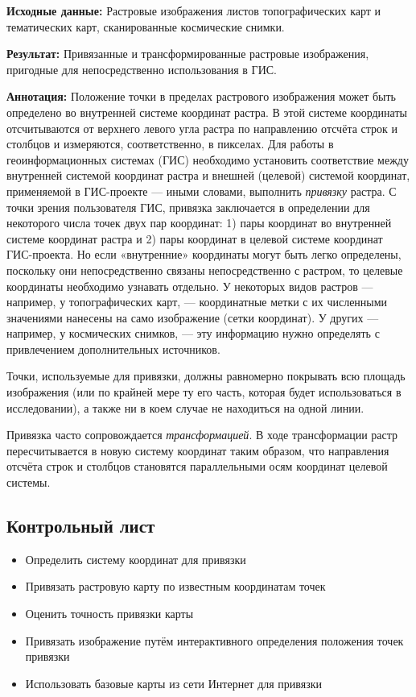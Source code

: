 \documentclass[
  12pt,
]{book}
\providecommand{\tightlist}{%
  \setlength{\itemsep}{0pt}\setlength{\parskip}{0pt}}
\begin{document}
\textbf{Исходные данные:} Растровые изображения листов топографических карт и тематических карт, сканированные космические снимки.

\textbf{Результат:} Привязанные и трансформированные растровые изображения, пригодные для непосредственно использования в ГИС.

\textbf{Аннотация:} Положение точки в пределах растрового изображения может быть определено во внутренней системе координат растра. В этой системе координаты отсчитываются от верхнего левого угла растра по направлению отсчёта строк и столбцов и измеряются, соответственно, в пикселах. Для работы в геоинформационных системах (ГИС) необходимо установить соответствие между внутренней системой координат растра и внешней (целевой) системой координат, применяемой в ГИС-проекте --- иными словами, выполнить \emph{привязку} растра. С точки зрения пользователя ГИС, привязка заключается в определении для некоторого числа точек двух пар координат: 1) пары координат во внутренней системе координат растра и 2) пары координат в целевой системе координат ГИС-проекта. Но если «внутренние» координаты могут быть легко определены, поскольку они непосредственно связаны непосредственно с растром, то целевые координаты необходимо узнавать отдельно. У некоторых видов растров --- например, у топографических карт, --- координатные метки с их численными значениями нанесены на само изображение (сетки координат). У других --- например, у космических снимков, --- эту информацию нужно определять с привлечением дополнительных источников.

Точки, используемые для привязки, должны равномерно покрывать всю площадь изображения (или по крайней мере ту его часть, которая будет использоваться в исследовании), а также ни в коем случае не находиться на одной линии.

Привязка часто сопровождается \emph{трансформацией}. В ходе трансформации растр пересчитывается в новую систему координат таким образом, что направления отсчёта строк и столбцов становятся параллельными осям координат целевой системы.

\hypertarget{raster-reference-control}{%
\subsection{Контрольный лист}\label{raster-reference-control}}

\begin{itemize}
\tightlist
\item
  Определить систему координат для привязки
\item
  Привязать растровую карту по известным координатам точек
\item
  Оценить точность привязки карты
\item
  Привязать изображение путём интерактивного определения положения точек привязки
\item
  Использовать базовые карты из сети Интернет для привязки
\end{itemize}
\end{document}
